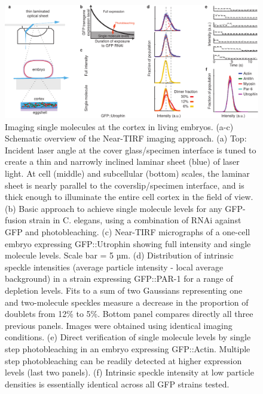  \begin{figure}[h!]
 	\centering
 	\includegraphics[width=\hsize]{nmeth/Fig1}
 	\caption{\label{fig:fig1} Imaging single molecules at the cortex in living embryos. (a-c) Schematic overview of the Near-TIRF imaging approach. (a) Top: Incident laser angle at the cover glass/specimen interface is tuned to create a thin and narrowly inclined laminar sheet (blue) of laser light. At cell (middle) and subcellular (bottom) scales, the laminar sheet is nearly parallel to the coverslip/specimen interface, and is thick enough to illuminate the entire cell cortex in the field of view. (b) Basic approach to achieve single molecule levels for any GFP-fusion strain in C. elegans, using a combination of RNAi against GFP and photobleaching. (c) Near-TIRF micrographs of a one-cell embryo expressing GFP::Utrophin showing full intensity and single molecule levels. Scale bar = 5 µm. (d) Distribution of intrinsic speckle intensities (average particle intensity - local average background) in a strain expressing GFP::PAR-1 for a range of depletion levels. Fits to a sum of two Gaussians representing one and two-molecule speckles measure a decrease in the proportion of doublets from 12\% to 5\%. Bottom panel compares directly all three previous panels. Images were obtained using identical imaging conditions. (e) Direct verification of single molecule levels by single step photobleaching in an embryo expressing GFP::Actin. Multiple step photobleaching can be readily detected at higher expression levels (last two panels). (f) Intrinsic speckle intensity at low particle densities is essentially identical across all GFP strains tested.}
 \end{figure}
 
 
 

